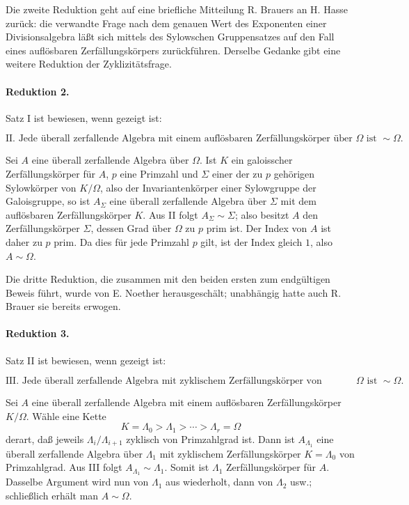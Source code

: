 \documentclass[11pt]{article}
\providecommand{\Om}{\Omega}
\begin{document}
Die zweite Reduktion geht auf eine briefliche Mitteilung R. Brauers an H. Hasse zurück: die verwandte Frage nach dem genauen Wert des Exponenten einer Divisionsalgebra läßt sich mittels des Sylowschen Gruppensatzes auf den Fall eines auflösbaren Zerfällungskörpers zurückführen. Derselbe Gedanke gibt eine weitere Reduktion der Zyklizitätsfrage.

\paragraph{Reduktion 2.}
Satz I ist bewiesen, wenn gezeigt ist:

\[
\text{II. Jede überall zerfallende Algebra mit einem auflösbaren Zerfällungskörper über }\Om
\text{ ist } \sim\Om .
\]

Sei \(A\) eine überall zerfallende Algebra über \(\Om\). Ist \(K\) ein galoisscher Zerfällungskörper für \(A\), \(p\) eine Primzahl und \(\Sigma\) einer der zu \(p\) gehörigen Sylowkörper von \(K/\Om\), also der Invariantenkörper einer Sylowgruppe der Galoisgruppe, so ist \(A_\Sigma\) eine überall zerfallende Algebra über \(\Sigma\) mit dem auflösbaren Zerfällungskörper \(K\). Aus II folgt \(A_\Sigma\sim\Sigma\); also besitzt \(A\) den Zerfällungskörper \(\Sigma\), dessen Grad über \(\Om\) zu \(p\) prim ist. Der Index von \(A\) ist daher zu \(p\) prim. Da dies für jede Primzahl \(p\) gilt, ist der Index gleich \(1\), also \(A\sim\Om\).

Die dritte Reduktion, die zusammen mit den beiden ersten zum endgültigen Beweis führt, wurde von E. Noether herausgeschält; unabhängig hatte auch R. Brauer sie bereits erwogen.

\paragraph{Reduktion 3.}
Satz II ist bewiesen, wenn gezeigt ist:

\[
\text{III. Jede überall zerfallende Algebra mit zyklischem Zerfällungskörper von Primzahlgrad über }\Om
\text{ ist } \sim\Om .
\]

Sei \(A\) eine überall zerfallende Algebra mit einem auflösbaren Zerfällungskörper \(K/\Om\). Wähle eine Kette
\[
        K=\Lambda_0>\Lambda_1>\cdots>\Lambda_r=\Om
\]
derart, daß jeweils \(\Lambda_i/\Lambda_{i+1}\) zyklisch von Primzahlgrad ist. Dann ist \(A_{\Lambda_1}\) eine überall zerfallende Algebra über \(\Lambda_1\) mit zyklischem Zerfällungskörper \(K=\Lambda_0\) von Primzahlgrad. Aus III folgt \(A_{\Lambda_1}\sim\Lambda_1\). Somit ist \(\Lambda_1\) Zerfällungskörper für \(A\). Dasselbe Argument wird nun von \(\Lambda_1\) aus wiederholt, dann von \(\Lambda_2\) usw.; schließlich erhält man \(A\sim\Om\).
\end{document}
